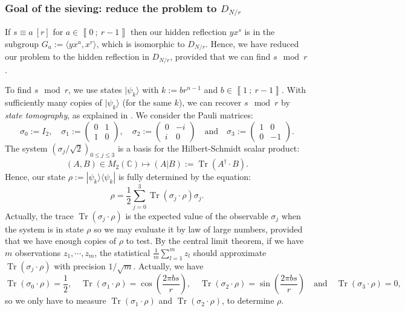 \documentclass[a4paper,10pt,notitlepage]{report}
\theoremstyle{definition}
\theoremstyle{plain}
\theoremstyle{definition}
\newcommand{\C}{\mathbb{C}}
\renewcommand{\i}[2]{\left\llbracket #1~;~#2\right\rrbracket}
\renewcommand{\(}{\left(}
\renewcommand{\)}{\right)}
\DeclareMathOperator{\Tr}{Tr}
\begin{document}
\subsubsection{Goal of the sieving: reduce the problem to $D_{N/r}$}\label{Paragraph 13}

If $s\equiv a \ [r]$ for $a\in\i{0}{r-1}$ then our hidden reflection $yx^s$ is in the subgroup $G_a:=\langle yx^a,x^r\rangle$, which is isomorphic to $D_{N/r}$. Hence, we have reduced our problem to the hidden reflection in $D_{N/r}$, provided that we can find $s \mod r$.

To find $s \mod r$, we use states $|\psi_k\rangle$ with $k:=br^{n-1}$ and $b\in\i{1}{r-1}$. With sufficiently many copies of $|\psi_k\rangle$ (for the same $k$), we can recover $s \mod r$ by \emph{state tomography}, as explained in \cite[§ 8.4.2, p.389]{NielsanChaung}. We consider the Pauli matrices:
\[\sigma_0:=I_2, \quad \sigma_1:=\(\begin{array}{cc}
0 & 1\\
1 & 0
\end{array}\), \quad \sigma_2:=\(\begin{array}{cc}
0 & -i\\
i & 0
\end{array}\) \quad \mbox{and} \quad \sigma_3:=\(\begin{array}{cc}
1 & 0\\
0 & -1
\end{array}\).\]
The system $(\sigma_j/\sqrt{2})_{0\leq j\leq 3}$ is a basis for the Hilbert-Schmidt scalar product:
\[(A,B)\in M_2(\C)\longmapsto (A|B):=\Tr(A^{\dag}\cdot B).\]
Hence, our state $\rho:=|\psi_k\rangle\langle\psi_k|$ is fully determined by the equation: 
\[\rho=\frac{1}{2}\sum_{j=0}^3\Tr(\sigma_j\cdot\rho)\sigma_j.\]
Actually, the trace $\Tr(\sigma_j\cdot\rho)$ is the expected value of the observable $\sigma_j$ when the system is in state $\rho$ so we may evaluate it by law of large numbers,  provided that we have enough copies of $\rho$ to test. By the central limit theorem, if we have $m$ observations $z_1, \cdots, z_m$, the statistical $\frac{1}{m}\sum_{l=1}^m z_l$ should approximate $\Tr(\sigma_j\cdot\rho)$ with precision $1/\sqrt{m}$.  Actually, we have
\[\Tr(\sigma_0\cdot\rho)=\frac{1}{2}, \quad \Tr(\sigma_1\cdot\rho)=\cos\(\frac{2\pi bs}{r}\), \quad \Tr(\sigma_2\cdot\rho)=\sin\(\frac{2\pi bs}{r}\) \quad \mbox{and} \quad \Tr(\sigma_3\cdot\rho)=0,\]
so we only have to measure $\Tr(\sigma_1\cdot\rho)$ and $\Tr(\sigma_2\cdot\rho)$, to determine $\rho$.
\end{document}
